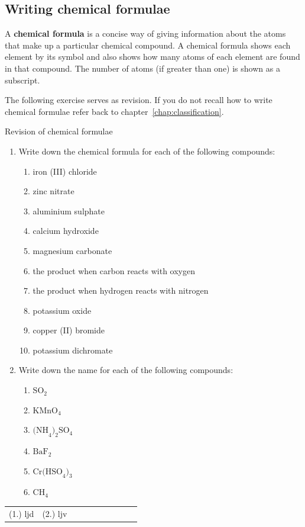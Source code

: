 \subsection*{Writing chemical formulae}
\nopagebreak
\label{m38721*id62835}A \textbf{chemical formula} is a concise way of giving information about the atoms that make up a particular chemical compound. A chemical formula shows each element by its symbol and also shows how many atoms of each element are found in that compound. The number of atoms (if greater than one) is shown as a subscript.\par 
The following exercise serves as revision. If you do not recall how to write chemical formulae refer back to chapter~\ref{chap:classification}.
\begin{exercises}{Revision of chemical formulae}
\begin{enumerate}[noitemsep, label=\textbf{\arabic*}.]
  \item Write down the chemical formula for each of the following compounds:
\begin{multicols}{2}
\begin{enumerate}[noitemsep, label=\textbf{\alph*}. ]
 \item iron (III) chloride
\item zinc nitrate
\item aluminium sulphate
\item calcium hydroxide
\item magnesium carbonate
\item the product when carbon reacts with oxygen
\item the product when hydrogen reacts with nitrogen
\item potassium oxide
\item copper (II) bromide
\item potassium dichromate
\end{enumerate}
\end{multicols}
\item Write down the name for each of the following compounds:
\begin{multicols}{2}
\begin{enumerate}[noitemsep, label=\textbf{\alph*}. ]
 \item $\text{SO}_2$
\item $\text{KMnO}_4$
\item $\text{(NH}_{4}\text{)}_{2}\text{SO}_{4}$
\item $\text{BaF}_2$
\item $\text{Cr(HSO}_{4}\text{)}_{3}$
\item $\text{CH}_{4}$
\end{enumerate}
\end{multicols}
\end{enumerate}
 \par \begin{tabular}[h]{cccccc}
 (1.) ljd  &  (2.) ljv   &   &    &  &   &   &   &   &    & \end{tabular}
\end{exercises}

